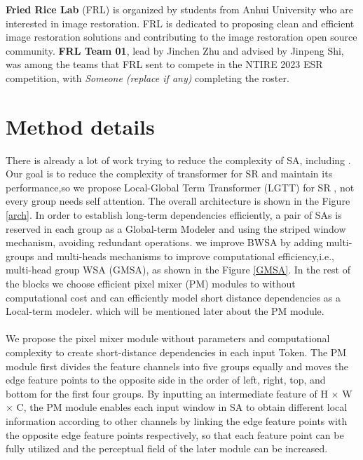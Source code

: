 \documentclass[10pt,twocolumn,letterpaper]{article}
\begin{document}
\textbf{Fried Rice Lab} (FRL) is organized by students from Anhui University who are interested in image restoration. FRL is dedicated to proposing clean and efficient image restoration solutions and contributing to the image restoration open source community. \textbf{FRL Team 01}, lead by Jinchen Zhu and advised by Jinpeng Shi, was among the teams that FRL sent to compete in the NTIRE 2023 ESR competition, with \textit{Someone (replace if any)} completing the roster.

\section{Method details}
There is already a lot of work trying to reduce the complexity of SA, including \cite{performer,sparsetrans,reformer}. Our goal is to reduce the complexity of transformer for SR and maintain its performance,so we propose Local-Global Term Transformer (LGTT) for SR , not every group needs self attention. The overall architecture is shown in the Figure \ref{arch}. In order to establish long-term dependencies efficiently, a pair of SAs is reserved in each group as a Global-term Modeler and using the striped window mechanism\cite{ESWT}, avoiding redundant operations. we improve BWSA by adding multi-groups and multi-heads mechanisms to improve computational efficiency,i.e., multi-head group WSA (GMSA), as shown in the Figure \ref{GMSA}. In the rest of the blocks we choose efficient pixel mixer (PM) modules to without computational cost and can efficiently model short distance dependencies as a Local-term modeler. which will be mentioned later about the PM module.
\\ \hspace*{\fill} \\
\label{PM}
We propose the pixel mixer module without parameters and computational complexity to create short-distance dependencies in each input Token. The PM module first divides the feature channels into five groups equally and moves the edge feature points to the opposite side in the order of left, right, top, and bottom for the first four groups. By inputting an intermediate feature of H $\times$ W $\times$ C, the PM module enables each input window in SA to obtain different local information according to other channels by linking the edge feature points with the opposite edge feature points respectively, so that each feature point can be fully utilized and the perceptual field of the later module can be increased.
\end{document}
